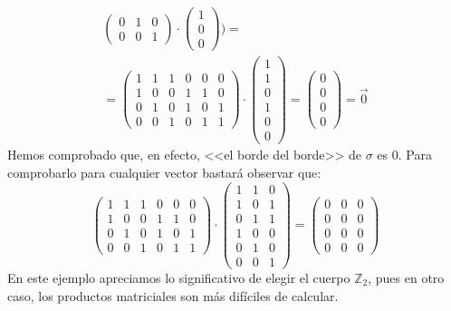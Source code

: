 \documentclass[12pt, a4paper, twoside]{book}
\numberwithin{equation}{section}
\theoremstyle{definition}
\newenvironment{ejem}
  {\pushQED{\qed}\renewcommand{\qedsymbol}{$\blacktriangleleft$}\ejemplo}
  {\popQED\endejemplo}
\theoremstyle{remark}
\theoremstyle{plain}
\begin{document}
\begin{ejem}
\begin{equation*}
\begin{split}
\begin{pmatrix}
				0 & 1 & 0 \\
				0 & 0 & 1
				\end{pmatrix}
				\cdot
				\begin{pmatrix}
				1 \\
				0 \\
				0 
				\end{pmatrix} \Bigg ) = \\
				=\begin{pmatrix}
				1 & 1 & 1 & 0 & 0 &0 \\
				1 & 0 & 0 & 1 & 1 &0 \\
				0 & 1 & 0 & 1 & 0 &1 \\
				0 & 0 & 1 & 0 & 1 &1
				\end{pmatrix}
				\cdot
				\begin{pmatrix}
				1 \\
				1 \\
				0 \\
				1 \\
				0 \\
				0
				\end{pmatrix} =
				\begin{pmatrix}
                                0 \\
				0 \\
				0 \\
				0
				\end{pmatrix}=
				\vec{0}
			\end{split}
		\end{equation*}
		Hemos comprobado que, en efecto, <<el borde del borde>> de 
		$\sigma$ es 0. Para comprobarlo para cualquier vector bastará 
		observar que:
		\begin{equation*}
		\begin{pmatrix}
				1 & 1 & 1 & 0 & 0 &0 \\
				1 & 0 & 0 & 1 & 1 &0 \\
				0 & 1 & 0 & 1 & 0 &1 \\
				0 & 0 & 1 & 0 & 1 &1
			\end{pmatrix}\cdot 
				\begin{pmatrix}
				1 & 1 & 0 \\
				1 & 0 & 1 \\
				0 & 1 & 1 \\
				1 & 0 & 0 \\
				0 & 1 & 0 \\
				0 & 0 & 1
				\end{pmatrix}
				=
				\begin{pmatrix}
				0 & 0 & 0 \\
				0 & 0 & 0 \\
				0 & 0 & 0 \\
				0 & 0 & 0 
				\end{pmatrix}
		\end{equation*}
		En este ejemplo apreciamos lo significativo de elegir el 
		cuerpo $\mathbb{Z}_{2}$, pues en otro caso, los productos 
		matriciales son más difíciles de calcular.
	\end{ejem}
\end{document}
